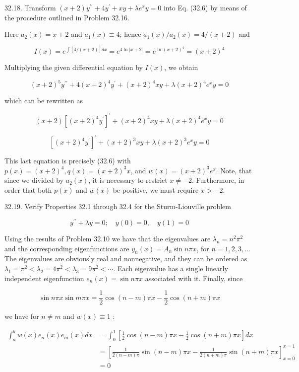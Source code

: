\documentclass[10pt]{article}
\begin{document}
32.18. Transform $(x+2) y^{\prime \prime}+4 y^{\prime}+x y+\lambda e^{x} y=0$ into Eq. (32.6) by means of the procedure outlined in Problem 32.16.

Here $a_{2}(x)=x+2$ and $a_{1}(x) \equiv 4$; hence $a_{1}(x) / a_{2}(x)=4 /(x+2)$ and

$$
I(x)=e^{\int[4 /(x+2)] d x}=e^{4 \ln |x+2|}=e^{\ln (x+2)^{4}}=(x+2)^{4}
$$

Multiplying the given differential equation by $I(x)$, we obtain

$$
(x+2)^{5} y^{\prime \prime}+4(x+2)^{4} y^{\prime}+(x+2)^{4} x y+\lambda(x+2)^{4} e^{x} y=0
$$

which can be rewritten as

$$
(x+2)\left[(x+2)^{4} y^{\prime}\right]^{\prime}+(x+2)^{4} x y+\lambda(x+2)^{4} e^{x} y=0
$$

$$
\left[(x+2)^{4} y^{\prime}\right]^{\prime}+(x+2)^{3} x y+\lambda(x+2)^{3} e^{x} y=0
$$

This last equation is precisely (32.6) with $p(x)=(x+2)^{4}, q(x)=(x+2)^{3} x$, and $w(x)=(x+2)^{3} e^{x}$. Note, that since we divided by $a_{2}(x)$, it is necessary to restrict $x \neq-2$. Furthermore, in order that both $p(x)$ and $w(x)$ be positive, we must require $x>-2$.

32.19. Verify Properties 32.1 through 32.4 for the Sturm-Liouville problem

$$
y^{\prime \prime}+\lambda y=0 ; \quad y(0)=0, \quad y(1)=0
$$

Using the results of Problem 32.10 we have that the eigenvalues are $\lambda_{n}=n^{2} \pi^{2}$ and the corresponding eigenfunctions are $y_{n}(x)=A_{n} \sin n \pi x$, for $n=1,2,3, \ldots$ The eigenvalues are obviously real and nonnegative, and they can be ordered as $\lambda_{1}=\pi^{2}<\lambda_{2}=4 \pi^{2}<\lambda_{3}=9 \pi^{2}<\cdots$. Each eigenvalue has a single linearly independent eigenfunction $e_{n}(x)=\sin n \pi x$ associated with it. Finally, since

$$
\sin n \pi x \sin m \pi x=\frac{1}{2} \cos (n-m) \pi x-\frac{1}{2} \cos (n+m) \pi x
$$

we have for $n \neq m$ and $w(x) \equiv 1$ :

$$
\begin{aligned}
\int_{a}^{b} w(x) e_{n}(x) e_{m}(x) d x & =\int_{0}^{1}\left[\frac{1}{2} \cos (n-m) \pi x-\frac{1}{2} \cos (n+m) \pi x\right] d x \\
& =\left[\frac{1}{2(n-m) \pi} \sin (n-m) \pi x-\frac{1}{2(n+m) \pi} \sin (n+m) \pi x\right]_{x=0}^{x=1} \\
& =0
\end{aligned}
$$
\end{document}
